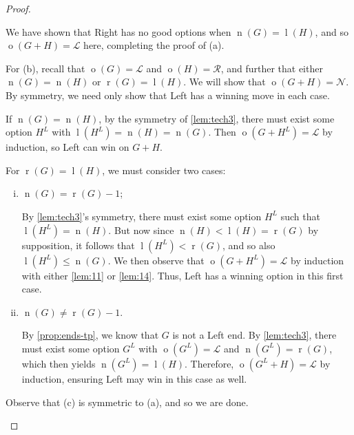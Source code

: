 \documentclass[11pt]{article}
\theoremstyle{definition}
\DeclareMathOperator{\outcome}{o}
\DeclareMathOperator{\ltp}{l}
\DeclareMathOperator{\ntp}{n}
\DeclareMathOperator{\rtp}{r}
\begin{document}
\begin{proof}
\begin{enumerate}
            We have shown that Right has no good options when
            $\ntp(G)=\ltp(H)$, and so $\outcome(G+H)=\mathscr{L}$ here,
            completing the proof of (a).

            For (b), recall that $\outcome(G)=\mathscr{L}$ and
            $\outcome(H)=\mathscr{R}$, and further that either
            $\ntp(G)=\ntp(H)$ or $\rtp(G)=\ltp(H)$. We will show that
            $\outcome(G+H)=\mathscr{N}$. By symmetry, we need only show that
            Left has a winning move in each case.

            If $\ntp(G)=\ntp(H)$, by the symmetry of \cref{lem:tech3}, there
            must exist some option $H^L$ with $\ltp(H^L)=\ntp(H)=\ntp(G)$. Then
            $\outcome(G+H^L)=\mathscr{L}$ by induction, so Left can win on
            $G+H$.

            For $\rtp(G)=\ltp(H)$, we must consider two cases:
            \begin{enumerate}[i)]
                \item $\ntp(G)=\rtp(G)-1$;

                    By \cref{lem:tech3}'s symmetry, there must exist some
                    option $H^L$ such that $\ltp(H^L)=\ntp(H)$. But now since
                    $\ntp(H)<\ltp(H)=\rtp(G)$ by supposition, it follows that
                    $\ltp(H^L)<\rtp(G)$, and so also $\ltp(H^L)\leq\ntp(G)$. We
                    then observe that $\outcome(G+H^L)=\mathscr{L}$ by
                    induction with either \cref{lem:11} or \cref{lem:14}. Thus,
                    Left has a winning option in this first case.

                \item $\ntp(G)\neq\rtp(G)-1$.

                    By \cref{prop:ends-tp}, we know that $G$ is not a Left end.
                    By \cref{lem:tech3}, there must exist some option $G^L$
                    with $\outcome(G^L)=\mathscr{L}$ and $\ntp(G^L)=\rtp(G)$,
                    which then yields $\ntp(G^L)=\ltp(H)$. Therefore,
                    $\outcome(G^L+H)=\mathscr{L}$ by induction, ensuring Left
                    may win in this case as well.
            \end{enumerate}

            Observe that (c) is symmetric to (a), and so we are done.
    \end{enumerate}
\end{proof}
\end{document}
